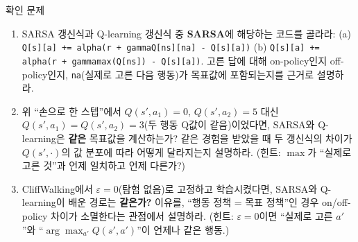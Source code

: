 \documentclass[aspectratio=169,11pt]{beamer}
\begin{document}
\begin{frame}{확인 문제}
  \small
  \begin{enumerate}
    \item SARSA 갱신식과 Q-learning 갱신식 중 \textbf{SARSA}에 해당하는
      코드를 골라라:
      (a) \texttt{Q[s][a] += alpha(r + gammaQ[ns][na] - Q[s][a])}
      (b) \texttt{Q[s][a] += alpha(r + gammamax(Q[ns]) - Q[s][a])}.
      고른 답에 대해 on-policy인지 off-policy인지, \texttt{na}(실제로
      고른 다음 행동)가 목표값에 포함되는지를 근거로 설명하라.
    \item 위 ``손으로 한 스텝''에서 $Q(s',a_1)=0$, $Q(s',a_2)=5$ 대신
      \textbf{$Q(s',a_1)=Q(s',a_2)=3$}(두 행동 Q값이 같음)이었다면,
      SARSA와 Q-learning은 \textbf{같은} 목표값을 계산하는가?
      같은 경험을 받았을 때 두 갱신식의 차이가 $Q(s',\cdot)$의 값
      분포에 따라 어떻게 달라지는지 설명하라.
      (힌트: $\max$가 ``실제로 고른 것''과 언제 일치하고 언제 다른가?)
    \item CliffWalking에서 $\varepsilon = 0$(탐험 없음)로 고정하고
      학습시켰다면, SARSA와 Q-learning이 배운 경로는 \textbf{같은가?}
      이유를, ``행동 정책 = 목표 정책''인 경우 on/off-policy 차이가
      소멸한다는 관점에서 설명하라.
      (힌트: $\varepsilon=0$이면 ``실제로 고른 $a'$''와
      ``$\arg\max_{a'}Q(s',a')$''이 언제나 같은 행동.)
  \end{enumerate}
\end{frame}

\end{document}
